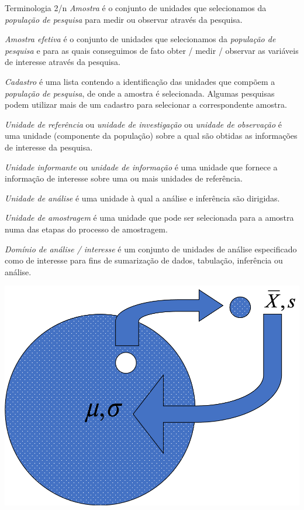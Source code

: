 \documentclass[
  9pt,
  ignorenonframetext,
  aspectratio=169]{beamer}
\begin{document}
\begin{frame}{Terminologia 2/n}
\protect\hypertarget{terminologia-2n}{}
\emph{Amostra} é o conjunto de unidades que selecionamos da
\emph{população de pesquisa} para medir ou observar através da pesquisa.

\emph{Amostra efetiva} é o conjunto de unidades que selecionamos da
\emph{população de pesquisa} e para as quais conseguimos de fato obter /
medir / observar as variáveis de interesse através da pesquisa.

\emph{Cadastro} é uma lista contendo a identificação das unidades que
compõem a \emph{população de pesquisa}, de onde a amostra é selecionada.
Algumas pesquisas podem utilizar mais de um cadastro para selecionar a
correspondente amostra.

\emph{Unidade de referência} ou \emph{unidade de investigação} ou
\emph{unidade de observação} é uma unidade (componente da população)
sobre a qual são obtidas as informações de interesse da pesquisa.

\emph{Unidade informante} ou \emph{unidade de informação} é uma unidade
que fornece a informação de interesse sobre uma ou mais unidades de
referência.

\emph{Unidade de análise} é uma unidade à qual a análise e inferência
são dirigidas.

\emph{Unidade de amostragem} é uma unidade que pode ser selecionada para
a amostra numa das etapas do processo de amostragem.

\emph{Domínio de análise / interesse} é um conjunto de unidades de
análise especificado como de interesse para fins de sumarização de
dados, tabulação, inferência ou análise.
\end{frame}

\begin{frame}{}
\protect\hypertarget{section-2}{}
\includegraphics{imgs/parametro_estat.png}
\end{frame}
\end{document}
